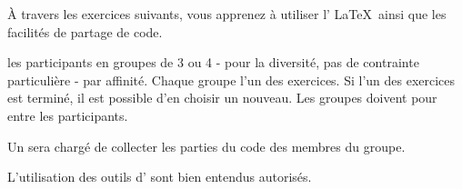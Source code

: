 \begin{Activite}

    \`A travers les exercices suivants, vous apprenez à utiliser l' \LaTeX\ ainsi que les facilités de partage de code. 

     \hspace{1cm}\hspace{3cm}
    \begin{tcbenumerate}
        \tcbitem {}  les participants en groupes de 3 ou 4 - pour la diversité, pas de contrainte particulière - par affinité. 
        \tcbitem {} Chaque groupe  l'un des exercices. Si l'un des exercices est terminé, il est possible d'en choisir un nouveau. 
        \tcbitem {} Les groupes doivent  pour  entre les participants. 
        
        Un  sera chargé de collecter les parties du code des membres du groupe.  
    \end{tcbenumerate}
    
    L'utilisation des outils d' sont bien entendus autorisés.

\end{Activite}